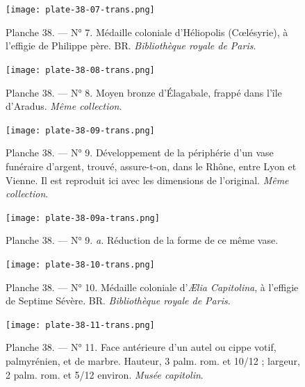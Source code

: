 \documentclass[a4paper, 11pt, oneside, polutonikogreek, french]{article}
\begin{document}
\vspace*{\fill}
\clearpage
\vspace*{\fill}
\begin{figure}[H]
\centering
\texttt{[image: plate-38-07-trans.png]}
\caption{\scriptsize Planche 38. --- N° 7. Médaille coloniale d'Héliopolis (Cœlésyrie), à l'effigie de Philippe père. BR. \emph{Bibliothèque royale de Paris}.}
\end{figure}
\vspace*{\fill}
\clearpage
\vspace*{\fill}
\begin{figure}[H]
\centering
\texttt{[image: plate-38-08-trans.png]}
\caption{\scriptsize Planche 38. --- N° 8. Moyen bronze d'Élagabale, frappé dans l'île d'Aradus. \emph{Même collection}.}
\end{figure}
\vspace*{\fill}
\clearpage
\vspace*{\fill}
\begin{figure}[H]
\centering
\texttt{[image: plate-38-09-trans.png]}
\caption{\scriptsize Planche 38. --- N° 9. Développement de la périphérie d'un vase funéraire d'argent, trouvé, assure-t-on, dans le Rhône, entre Lyon et Vienne. Il est reproduit ici avec les dimensions de l'original. \emph{Même collection}.}
\end{figure}
\vspace*{\fill}
\clearpage
\vspace*{\fill}
\begin{figure}[H]
\centering
\texttt{[image: plate-38-09a-trans.png]}
\caption{\scriptsize Planche 38. --- N° 9. \emph{a.} Réduction de la forme de ce même vase.}
\end{figure}
\vspace*{\fill}
\clearpage
\vspace*{\fill}
\begin{figure}[H]
\centering
\texttt{[image: plate-38-10-trans.png]}
\caption{\scriptsize Planche 38. --- N° 10. Médaille coloniale d'\emph{Ælia Capitolina}, à l'effigie de Septime Sévère. BR. \emph{Bibliothèque royale de Paris}.}
\end{figure}
\vspace*{\fill}
\clearpage
\vspace*{\fill}
\begin{figure}[H]
\centering
\texttt{[image: plate-38-11-trans.png]}
\caption{\scriptsize Planche 38. --- N° 11. Face antérieure d'un autel ou cippe votif, palmyrénien, et de marbre. Hauteur, 3 palm. rom. et 10/12 ; largeur, 2 palm. rom. et 5/12 environ. \emph{Musée capitolin}.}
\end{figure}
\end{document}

